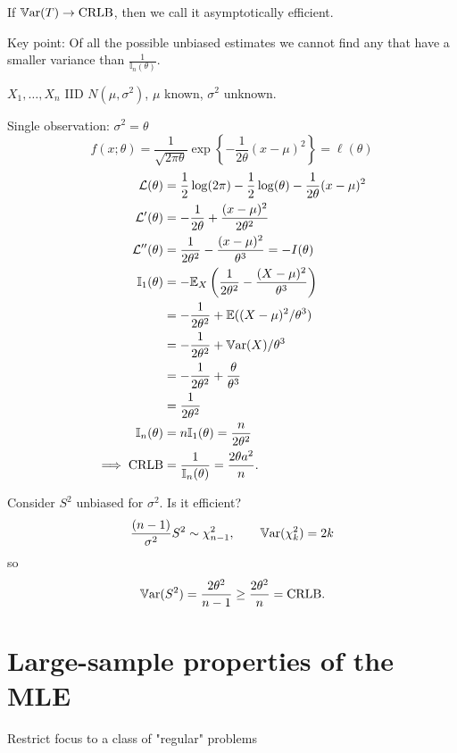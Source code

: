 \documentclass[10pt, a4paper]{article}
\begin{document}
If $\mathbb{V}\mathrm{ar}(T) \to \text{CRLB}$,
then we call it asymptotically efficient.

Key point:
Of all the possible unbiased estimates we cannot find any that have a smaller variance than $\frac{1}{\mathbb{I}_n(\theta)}$.

\begin{example}
    $X_1, \dotsc, X_n$ IID $N(\mu, \sigma ^ 2)$,
    $\mu$ known,
    $\sigma ^ 2$ unknown.

    Single observation:
    $\sigma ^ 2 = \theta$
    \[
    f(x; \theta) = \frac{1}{\sqrt{2\pi\theta}}\exp\left\{-\frac{1}{2\theta}(x - \mu) ^ 2\right\} = \ell(\theta)
    \]
    \begin{align*}
        \mathcal{L}(\theta) &= \frac{1}{2}\log(2\pi) - \frac{1}{2}\log(\theta) - \frac{1}{2\theta}(x - \mu) ^ 2 \\
        \mathcal{L}'(\theta) &= -\frac{1}{2\theta} + \frac{(x - \mu) ^ 2}{2\theta ^ 2} \\
        \mathcal{L}''(\theta) &= \frac{1}{2\theta ^ 2} - \frac{(x - \mu) ^ 2}{\theta ^ 3} = -I(\theta) \\
        \mathbb{I}_1(\theta) &= -\mathbb{E}_{X}\left(\frac{1}{2\theta ^ 2} - \frac{(X - \mu) ^ 2}{\theta ^ 3}\right) \\
        &= -\frac{1}{2\theta ^ 2} + \mathbb{E}((X - \mu) ^ 2 / \theta ^ 3) \\
        &= -\frac{1}{2\theta ^ 2} + \mathbb{V}\mathrm{ar}(X) / \theta ^ 3 \\
        &= -\frac{1}{2\theta ^ 2} + \frac{\theta}{\theta ^ 3} \\
        &= \frac{1}{2\theta ^ 2} \\
        \mathbb{I}_n(\theta) &= n\mathbb{I}_1(\theta) = \frac{n}{2\theta ^ 2} \\
        \implies \text{CRLB} &= \frac{1}{\mathbb{I}_n(\theta)} = \frac{2\theta a^ 2}{n}.
    \end{align*}

    Consider $S ^ 2$ unbiased for $\sigma ^ 2$.
    Is it efficient?
    \[
    \frac{(n - 1)}{\sigma ^ 2}S ^ 2 \sim \chi_{n - 1}^{2},\qquad \mathbb{V}\mathrm{ar}(\chi_{k}^{2}) = 2k
    \]
    so
    \[
    \mathbb{V}\mathrm{ar}(S ^ 2) = \frac{2\theta ^ 2}{n - 1} \geq \frac{2\theta ^ 2}{n} = \text{CRLB}.
    \]
\end{example}

\newpage
\section{Large-sample properties of the MLE}
Restrict focus to a class of "regular" problems
\end{document}
